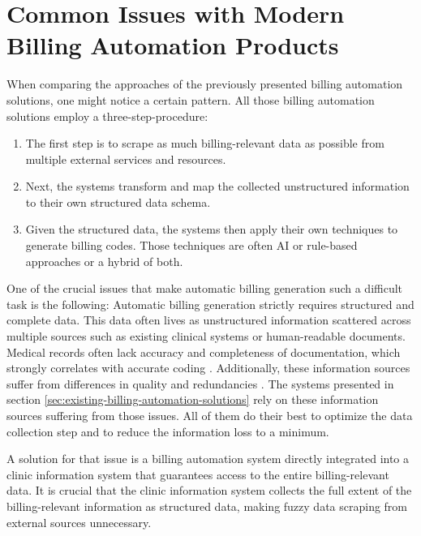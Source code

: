 \section{Common Issues with Modern Billing Automation Products}\label{sec:common-issues-with-modern-billing-automation-products}
When comparing the approaches of the previously presented billing automation solutions, one might notice a certain pattern.
All those billing automation solutions employ a three-step-procedure:
\begin{enumerate}
    \item The first step is to scrape as much billing-relevant data as possible from multiple external services and resources.
    \item Next, the systems transform and map the collected unstructured information to their own structured data schema.
    \item Given the structured data, the systems then apply their own techniques to generate billing codes.
    Those techniques are often AI or rule-based approaches or a hybrid of both.
\end{enumerate}

One of the crucial issues that make automatic billing generation such a difficult task is the following:
Automatic billing generation strictly requires structured and complete data. \addcite
This data often lives as unstructured information scattered across multiple sources such as existing clinical systems or human-readable documents.
Medical records often lack accuracy and completeness of documentation, which strongly correlates with accurate coding \cite{Farhan2005Documentation}.
Additionally, these information sources suffer from differences in quality and redundancies \cite{Scheurwegs2017Selecting}.
The systems presented in section \ref{sec:existing-billing-automation-solutions} rely on these information sources suffering from those issues.
All of them do their best to optimize the data collection step and to reduce the information loss to a minimum.

A solution for that issue is a billing automation system directly integrated into a clinic information system that guarantees access to the entire billing-relevant data.
It is crucial that the clinic information system collects the full extent of the billing-relevant information as structured data, making fuzzy data scraping from external sources unnecessary.

